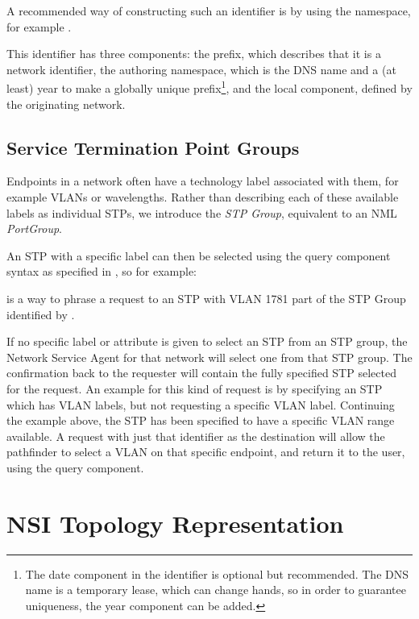 \documentclass[12pt]{article}  %
\begin{document}
A recommended way of constructing such an identifier is by using 
the  namespace, for example .

This identifier has three components: the prefix,  
which describes that it is a network identifier, the authoring namespace,  
which is the DNS name and a (at least) year to make a globally unique prefix\footnote{  
The date component in the identifier is optional but recommended. The DNS name 
is a temporary lease, which can change hands, so in order to guarantee uniqueness, 
the year component can be added.}, and the local component,  defined by the originating 
network.


\subsection{Service Termination Point Groups}

Endpoints in a network often have a technology label associated 
with them, for example VLANs or wavelengths. Rather than describing each of these 
available labels as individual STPs, we introduce the \emph{STP Group}, equivalent to 
an NML \emph{PortGroup}.

An STP with a specific label can then be selected using the query 
component syntax as specified in \cite{RFC3986}, so for example:

 is a way to phrase 
a request to an STP with VLAN 1781 part of the STP Group identified by 
.


If no specific label or attribute is given to select an STP from 
an STP group, the Network Service Agent for that network will select one from that STP group. The 
confirmation back to the requester will contain the fully specified STP selected 
for the request. An example for this kind of request is by specifying an STP which 
has VLAN labels, but not requesting a specific VLAN label. Continuing the example 
above, the STP  has been specified to have a 
specific VLAN range available. A request with just that identifier as the destination 
will allow the pathfinder to select a VLAN on that specific endpoint, and return 
it to the user, using the query component.


\section{NSI Topology Representation} %
\label{sub:nsi_topology_representation}
\end{document}
